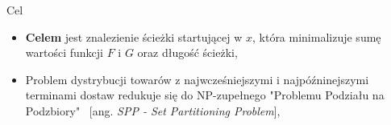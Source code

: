 \begin{block}{Cel}
\begin{itemize}
\item \textbf{Celem} jest znalezienie ścieżki startującej w $x$, która minimalizuje sumę wartości funkcji $F$ i $G$ oraz długość ścieżki,
\pause
\item Problem dystrybucji towarów z najwcześniejszymi i najpóźninejszymi terminami dostaw redukuje się do NP-zupełnego "Problemu Podziału na Podzbiory" \ [ang. \textit{SPP - Set Partitioning Problem}],
\end{itemize}
\end{block}
